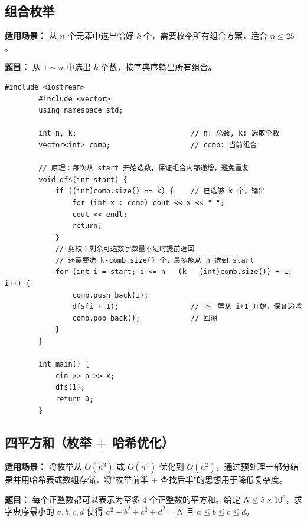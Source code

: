 \documentclass[12pt,a4paper]{ctexart}
\begin{document}
	\subsection{组合枚举}
	\textbf{适用场景：} 从 \(n\) 个元素中选出恰好 \(k\) 个，需要枚举所有组合方案，适合 \(n \le 25\)。
	
	\textbf{题目：} 从 \(1 \sim n\) 中选出 \(k\) 个数，按字典序输出所有组合。
	
	\begin{lstlisting}[caption={DFS枚举组合（字典序）}]
		#include <iostream>
		#include <vector>
		using namespace std;
		
		int n, k;                           // n: 总数, k: 选取个数
		vector<int> comb;                   // comb: 当前组合
		
		// 原理：每次从 start 开始选数，保证组合内部递增，避免重复
		void dfs(int start) {
			if ((int)comb.size() == k) {    // 已选够 k 个，输出
				for (int x : comb) cout << x << " ";
				cout << endl;
				return;
			}
			// 剪枝：剩余可选数字数量不足时提前返回
			// 还需要选 k-comb.size() 个，最多能从 n 选到 start
			for (int i = start; i <= n - (k - (int)comb.size()) + 1; i++) {
				comb.push_back(i);
				dfs(i + 1);                 // 下一层从 i+1 开始，保证递增
				comb.pop_back();            // 回溯
			}
		}
		
		int main() {
			cin >> n >> k;
			dfs(1);
			return 0;
		}
	\end{lstlisting}
	
	\subsection{四平方和（枚举 + 哈希优化）}
	\textbf{适用场景：} 将枚举从 \(O(n^3)\) 或 \(O(n^4)\) 优化到 \(O(n^2)\)，通过预处理一部分结果并用哈希表或数组存储，将"枚举前半 + 查找后半"的思想用于降低复杂度。
	
	\textbf{题目：} 每个正整数都可以表示为至多 \(4\) 个正整数的平方和。给定 \(N \le 5\times 10^6\)，求字典序最小的 \(a,b,c,d\) 使得 \(a^2+b^2+c^2+d^2=N\) 且 \(a\le b\le c\le d\)。
	
\end{document}
